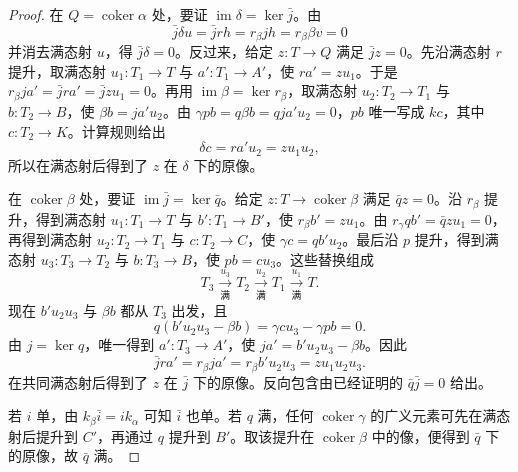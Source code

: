 \begin{proof}
	在 \(Q=\operatorname{coker}\alpha\) 处，要证 \(\operatorname{im}\delta=\ker\bar j\)。由
	\[
		\bar j\delta u=\bar jrh=r_\beta jh=r_\beta\beta v=0
	\]
	并消去满态射 \(u\)，得 \(\bar j\delta=0\)。反过来，给定 \(z:T\to Q\) 满足 \(\bar jz=0\)。先沿满态射 \(r\) 提升，取满态射 \(u_1:T_1\to T\) 与 \(a':T_1\to A'\)，使 \(ra'=zu_1\)。于是 \(r_\beta ja'=\bar jra'=\bar jzu_1=0\)。再用 \(\operatorname{im}\beta=\ker r_\beta\)，取满态射 \(u_2:T_2\to T_1\) 与 \(b:T_2\to B\)，使 \(\beta b=ja'u_2\)。由 \(\gamma pb=q\beta b=qja'u_2=0\)，\(pb\) 唯一写成 \(kc\)，其中 \(c:T_2\to K\)。计算规则给出
	\[
		\delta c=ra'u_2=zu_1u_2,
	\]
	所以在满态射后得到了 \(z\) 在 \(\delta\) 下的原像。

	在 \(\operatorname{coker}\beta\) 处，要证 \(\operatorname{im}\bar j=\ker\bar q\)。给定 \(z:T\to\operatorname{coker}\beta\) 满足 \(\bar qz=0\)。沿 \(r_\beta\) 提升，得到满态射 \(u_1:T_1\to T\) 与 \(b':T_1\to B'\)，使 \(r_\beta b'=zu_1\)。由 \(r_\gamma qb'=\bar qzu_1=0\)，再得到满态射 \(u_2:T_2\to T_1\) 与 \(c:T_2\to C\)，使 \(\gamma c=qb'u_2\)。最后沿 \(p\) 提升，得到满态射 \(u_3:T_3\to T_2\) 与 \(b:T_3\to B\)，使 \(pb=cu_3\)。这些替换组成
	\[
		T_3\xrightarrow[\text{满}]{\ u_3\ }T_2 \xrightarrow[\text{满}]{\ u_2\ }T_1 \xrightarrow[\text{满}]{\ u_1\ }T.
	\]
	现在 \(b'u_2u_3\) 与 \(\beta b\) 都从 \(T_3\) 出发，且
	\[
		q(b'u_2u_3-\beta b) =\gamma cu_3-\gamma pb=0.
	\]
	由 \(j=\ker q\)，唯一得到 \(a':T_3\to A'\)，使 \(ja'=b'u_2u_3-\beta b\)。因此
	\[
		\bar jra'=r_\beta ja'=r_\beta b'u_2u_3=zu_1u_2u_3.
	\]
	在共同满态射后得到了 \(z\) 在 \(\bar j\) 下的原像。反向包含由已经证明的 \(\bar q\bar j=0\) 给出。

	若 \(i\) 单，由 \(k_\beta\bar i=ik_\alpha\) 可知 \(\bar i\) 也单。若 \(q\) 满，任何 \(\operatorname{coker}\gamma\) 的广义元素可先在满态射后提升到 \(C'\)，再通过 \(q\) 提升到 \(B'\)。取该提升在 \(\operatorname{coker}\beta\) 中的像，便得到 \(\bar q\) 下的原像，故 \(\bar q\) 满。
\end{proof}

